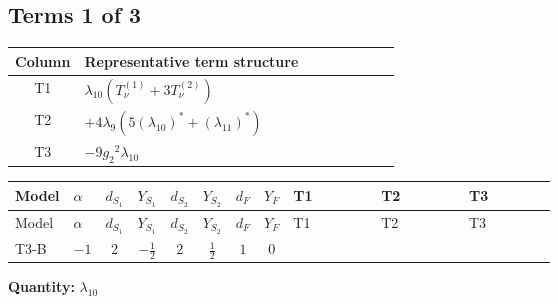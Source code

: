 \documentclass[8pt]{article}
\begin{document}
\begin{landscape}
\subsection*{Terms 1 of 3}
\begin{center}
\begin{tabular}{@{}c >{\raggedright\arraybackslash}p{0.82\linewidth}@{}}
\toprule
Column & Representative term structure \\
\midrule
T1 & \(\displaystyle {\lambda_{10}} (T_{\nu}^{(1)}+3 T_{\nu}^{(2)})\) \\
\midrule
T2 & \(\displaystyle +4 {\lambda_{9}} (5 \left({\lambda_{10}}\right)^{*}+\left({\lambda_{11}}\right)^{*})\) \\
\midrule
T3 & \(\displaystyle -9 {g_2}^2 {\lambda_{10}}\) \\
\midrule
\bottomrule
\end{tabular}
\end{center}
\smallskip
\tiny
\begin{longtable}{@{}llcccccc >{\raggedright\arraybackslash}p{0.21\linewidth} >{\raggedright\arraybackslash}p{0.21\linewidth} >{\raggedright\arraybackslash}p{0.21\linewidth}@{}}
\toprule
Model & $\alpha$ & $d_{S_1}$ & $Y_{S_1}$ & $d_{S_2}$ & $Y_{S_2}$ & $d_F$ & $Y_F$ & T1 & T2 & T3 \\
\midrule
\endfirsthead
\toprule
Model & $\alpha$ & $d_{S_1}$ & $Y_{S_1}$ & $d_{S_2}$ & $Y_{S_2}$ & $d_F$ & $Y_F$ & T1 & T2 & T3 \\
\midrule
\endhead
T3-B & $-1$ & $2$ & $-\frac{1}{2}$ & $2$ & $\frac{1}{2}$ & $1$ & $0$ & \scriptsize\adjustbox{max width=\linewidth}{$\begin{gathered} {\lambda_{10}} (T_{\nu}^{(1)}+3 T_{\nu}^{(2)})\end{gathered}$} & \scriptsize\adjustbox{max width=\linewidth}{$\begin{gathered} +4 {\lambda_{9}} (5 \left({\lambda_{10}}\right)^{*}+\left({\lambda_{11}}\right)^{*})\end{gathered}$} & \scriptsize\adjustbox{max width=\linewidth}{$\begin{gathered} -9 {g_2}^2 {\lambda_{10}}\end{gathered}$} \\
\midrule
\bottomrule
\end{longtable}
\clearpage
\noindent\textbf{Quantity: }$\lambda_{10}$\par\smallskip

\end{landscape}
\end{document}
